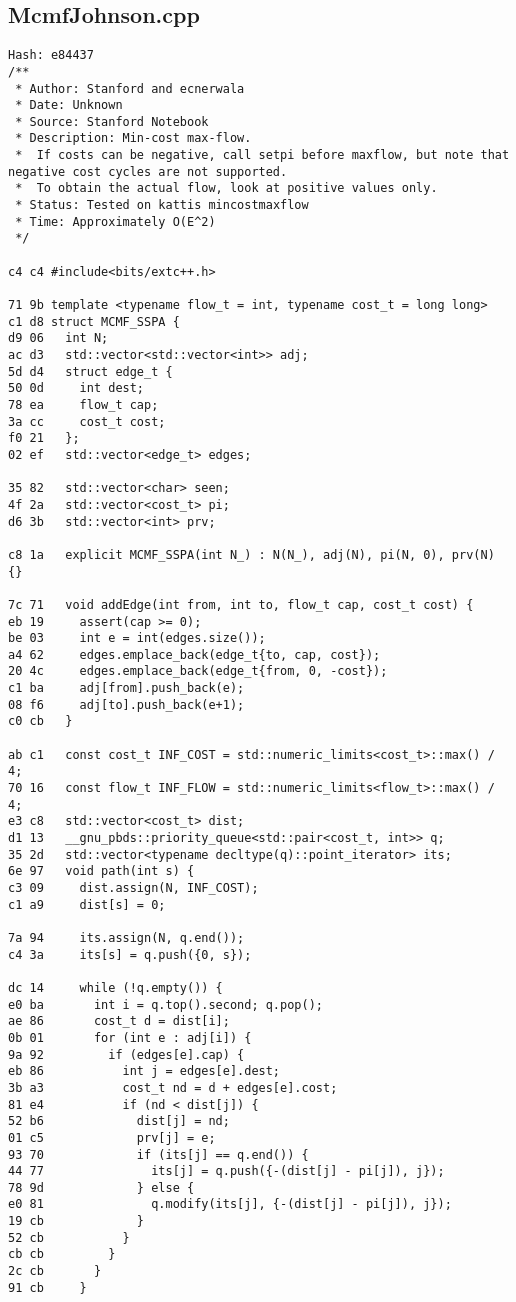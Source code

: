 \documentclass[11pt, a4paper, twoside]{article}
\begin{document}
\subsection{McmfJohnson.cpp}
\begin{lstlisting}
Hash: e84437
/**
 * Author: Stanford and ecnerwala
 * Date: Unknown
 * Source: Stanford Notebook
 * Description: Min-cost max-flow.
 *  If costs can be negative, call setpi before maxflow, but note that negative cost cycles are not supported.
 *  To obtain the actual flow, look at positive values only.
 * Status: Tested on kattis mincostmaxflow
 * Time: Approximately O(E^2)
 */

c4 c4 #include<bits/extc++.h>

71 9b template <typename flow_t = int, typename cost_t = long long>
c1 d8 struct MCMF_SSPA {
d9 06   int N;
ac d3   std::vector<std::vector<int>> adj;
5d d4   struct edge_t {
50 0d     int dest;
78 ea     flow_t cap;
3a cc     cost_t cost;
f0 21   };
02 ef   std::vector<edge_t> edges;
      
35 82   std::vector<char> seen;
4f 2a   std::vector<cost_t> pi;
d6 3b   std::vector<int> prv;
      
c8 1a   explicit MCMF_SSPA(int N_) : N(N_), adj(N), pi(N, 0), prv(N) {}
      
7c 71   void addEdge(int from, int to, flow_t cap, cost_t cost) {
eb 19     assert(cap >= 0);
be 03     int e = int(edges.size());
a4 62     edges.emplace_back(edge_t{to, cap, cost});
20 4c     edges.emplace_back(edge_t{from, 0, -cost});
c1 ba     adj[from].push_back(e);
08 f6     adj[to].push_back(e+1);
c0 cb   }
      
ab c1   const cost_t INF_COST = std::numeric_limits<cost_t>::max() / 4;
70 16   const flow_t INF_FLOW = std::numeric_limits<flow_t>::max() / 4;
e3 c8   std::vector<cost_t> dist;
d1 13   __gnu_pbds::priority_queue<std::pair<cost_t, int>> q;
35 2d   std::vector<typename decltype(q)::point_iterator> its;
6e 97   void path(int s) {
c3 09     dist.assign(N, INF_COST);
c1 a9     dist[s] = 0;
      
7a 94     its.assign(N, q.end());
c4 3a     its[s] = q.push({0, s});
      
dc 14     while (!q.empty()) {
e0 ba       int i = q.top().second; q.pop();
ae 86       cost_t d = dist[i];
0b 01       for (int e : adj[i]) {
9a 92         if (edges[e].cap) {
eb 86           int j = edges[e].dest;
3b a3           cost_t nd = d + edges[e].cost;
81 e4           if (nd < dist[j]) {
52 b6             dist[j] = nd;
01 c5             prv[j] = e;
93 70             if (its[j] == q.end()) {
44 77               its[j] = q.push({-(dist[j] - pi[j]), j});
78 9d             } else {
e0 81               q.modify(its[j], {-(dist[j] - pi[j]), j});
19 cb             }
52 cb           }
cb cb         }
2c cb       }
91 cb     }
      

\end{lstlisting}
\end{document}
